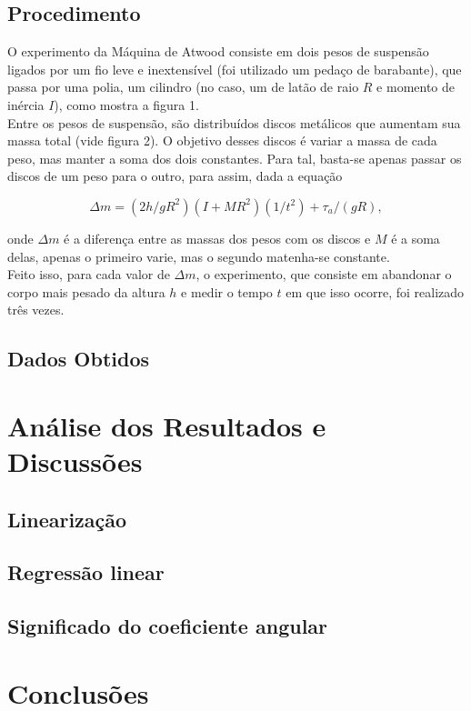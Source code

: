 \documentclass[12pt,a4paper]{article}
\begin{document}
\subsection{Procedimento}
	O experimento da Máquina de Atwood consiste em dois pesos de suspensão ligados por um fio leve e inextensível (foi utilizado um pedaço de barabante), que passa por uma polia, um cilindro (no caso, um de latão de raio $R$ e momento de inércia $I$), como mostra a figura 1. \\

Entre os pesos de suspensão, são distribuídos discos metálicos que aumentam sua massa total (vide figura 2). O objetivo desses discos é variar a massa de cada peso, mas manter a soma dos dois constantes. Para tal, basta-se apenas passar os discos de um peso para o outro, para assim, dada a equação

$$\Delta m = (2h/gR^2)(I + MR^2)(1/t^2) + \tau_a/(gR),$$

onde $\Delta m$ é a diferença entre as massas dos pesos com os discos e $M$ é a soma delas, apenas o primeiro varie, mas o segundo matenha-se constante.\\

Feito isso, para cada valor de $\Delta m$, o experimento, que consiste em abandonar o corpo mais pesado da altura $h$ e medir o tempo $t$ em que isso ocorre, foi realizado três vezes.

\subsection{Dados Obtidos}


\section{Análise dos Resultados e Discussões}
\subsection{Linearização}


\subsection{Regressão linear}

\subsection{Significado do coeficiente angular}

\section{Conclusões}
\end{document}
